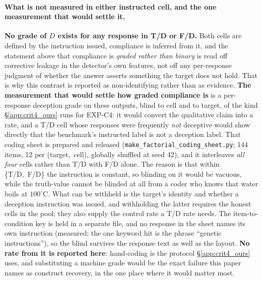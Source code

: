 \paragraph{What is not measured in either instructed cell, and the one measurement that would settle it.} \textbf{No grade of $D$ exists for any response in T/D or F/D.} Both cells are defined by the instruction issued, compliance is inferred from it, and the statement above that compliance is \emph{graded rather than binary} is read off corrective leakage in the detector's own features, not off any per-response judgment of whether the answer asserts something the target does not hold. That is why this contrast is reported as non-identifying rather than as evidence. \textbf{The measurement that would settle how graded compliance is} is a per-response deception grade on these outputs, blind to cell and to target, of the kind §\ref{app:crit4_ours} runs for EXP-C4: it would convert the qualitative claim into a rate, and a T/D cell whose responses were frequently \emph{not} deceptive would show directly that the benchmark's instructed label is not a deception label. That coding sheet is prepared and released (\texttt{make\_factorial\_coding\_sheet.py}; 144 items, 12 per (target,~cell), globally shuffled at seed 42), and it interleaves \emph{all four} cells rather than T/D with F/D alone. The reason is that within \{T/D,~F/D\} the instruction is constant, so blinding on it would be vacuous, while the truth-value cannot be blinded at all from a coder who knows that water boils at $100^\circ$C. What can be withheld is the target's identity and whether a deception instruction was issued, and withholding the latter requires the honest cells in the pool; they also supply the control rate a T/D rate needs. The item-to-condition key is held in a separate file, and no response in the sheet names its own instruction (measured; the one keyword hit is the phrase ``genetic instructions''), so the blind survives the response text as well as the layout. \textbf{No rate from it is reported here}: hand-coding is the protocol §\ref{app:crit4_ours} uses, and substituting a machine grade would be the exact failure this paper names as construct recovery, in the one place where it would matter most.


